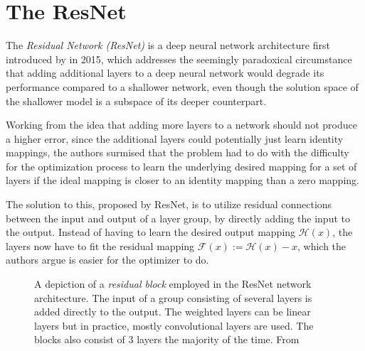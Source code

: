\section{The ResNet}
\label{sec:resnet}

The \emph{Residual Network (ResNet)} is a deep neural network architecture first introduced by \cite{heDeepResidualLearning2015} in 2015, which addresses the seemingly paradoxical circumstance that adding additional layers to a deep neural network would degrade its performance compared to a shallower network, even though the solution space of the shallower model is a subspace of its deeper counterpart. 

Working from the idea that adding more layers to a network should not produce a higher error, since the additional layers could potentially just learn identity mappings, the authors surmised that the problem had to do with the difficulty for the optimization process to learn the underlying desired mapping for a set of layers if the ideal mapping is closer to an identity mapping than a zero mapping.

The solution to this, proposed by ResNet, is to utilize residual connections between the input and output of a layer group, by directly adding the input to the output. 
Instead of having to learn the desired output mapping $\mathcal{H}(x)$, the layers now have to fit the residual mapping $\mathcal{F}(x) := \mathcal{H}(x) - x$, which the authors argue is easier for the optimizer to do.

\begin{figure}[htbp]
    \caption{A depiction of a \emph{residual block} employed in the ResNet network architecture. The input of a group consisting of several layers is added directly to the output. The weighted layers can be linear layers but in practice, mostly convolutional layers are used. The blocks also consist of 3 layers the majority of the time. From \cite{heDeepResidualLearning2015}}
    \label{fig:resblock}
\end{figure}


